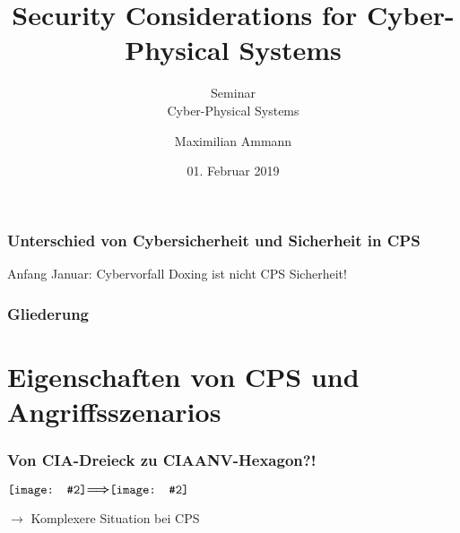 \documentclass{sikslides}
\title[Security Considerations for CPS]{Security Considerations for Cyber-Physical Systems}
\subtitle{Seminar \\Cyber-Physical Systems} %
\author{Maximilian Ammann}
\date[01.02.2019]{01. Februar 2019}
\newcommand*{\vcenterimage}[2]{\vcenter{\hbox{\texttt{[image: \#2]}}}}
\newcommand*{\vcenterarrow}{\vcenter{\hbox{$\bm{\Longrightarrow}$}}}
\begin{document}
    \titleframe

    \begin{frame}
        \frametitle{Unterschied von Cybersicherheit und Sicherheit in CPS}
        Anfang Januar: Cybervorfall Doxing ist nicht CPS Sicherheit!
    \end{frame}

    \begin{frame}
        \frametitle{Gliederung}
        \tableofcontents[pausesections]
    \end{frame}

    \section{Eigenschaften von CPS und Angriffsszenarios}

    \begin{frame}
        \frametitle{Von CIA-Dreieck zu CIAANV-Hexagon?!}
        \centering
        $\vcenterimage{2.5cm}{../figure/cia}\vcenterarrow\vcenterimage{3.5cm}{../figure/triad}$

        \vspace{40px}
        $\rightarrow$ Komplexere Situation bei CPS
    \end{frame}
\end{document}
